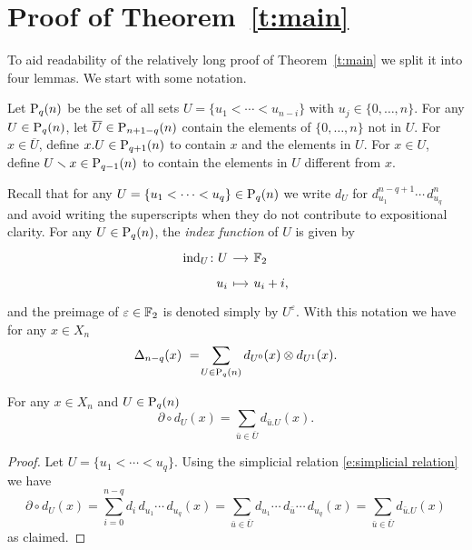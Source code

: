 
\section{Proof of Theorem~\ref{t:main}} \label{s:proof}

To aid readability of the relatively long proof of Theorem~\ref{t:main} we split it into four lemmas.
We start with some notation.

\begin{definition}
	Let $\P_q(n)$ be the set of all sets $U = \{u_1 < \cdots < u_{n-i}\}$ with $u_j \in \{0, \dots, n\}$.
	For any $U \in \P_q(n)$, let $\overline{U} \in \P_{n+1-q}(n)$ contain the elements of $\{0, \dots, n\}$ not in $U$. For $x \in \overline{U}$, define $x.U \in \P_{q+1}(n)$ to contain $x$ and the elements in $U$.
	For $x \in U$, define $U \sm x \in \P_{q-1}(n)$ to contain the elements in $U$ different from $x$.
\end{definition}

Recall that for any $U = \{u_1 < \cdots < u_q\} \in \P_q(n)$ we write $d_U$ for $d_{u_1}^{n-q+1} \cdots \,d_{u_q}^n$ and avoid writing the superscripts when they do not contribute to expositional clarity.
For any $U \in \P_q(n)$, the \textit{index function} of $U$ is given by
\begin{equation*}
\begin{tikzcd}[row sep=tiny, column sep=small,
/tikz/column 1/.append style={anchor=base east},
/tikz/column 2/.append style={anchor=base west}]
\ind_U \colon U \arrow[r] & \F_2 \\
u_i \arrow[r, mapsto] & u_i + i,
\end{tikzcd}
\end{equation*}
and the preimage of $\varepsilon \in \F_2$ is denoted simply by $U^\varepsilon$.
With this notation we have for any $x \in X_n$
\begin{equation*}
\Delta_{n-q}(x)\ =\! \sum_{U \in \P_q(n)} d_{U^0}(x) \otimes d_{U^1}(x).
\end{equation*}

\begin{lemma} \label{l:partial dU = dxU}
	For any $x \in X_n$ and $U \in \P_{q}(n)$
	\begin{equation} \label{lemma1: existence:eq1}
	\partial \circ d_U(x) = \sum_{\bar{u} \in \overline{U}} d_{\bar{u}.U}(x).
	\end{equation}
\end{lemma}

\begin{proof}
	Let $U = \{u_1 < \cdots < u_q\}$. Using the simplicial relation \eqref{e:simplicial relation} we have
	\begin{equation*}
	\partial \circ d_U(x) = 
	\sum_{i=0}^{n-q} d_i\, d_{u_1} \cdots\, d_{u_q}(x) = 
	\sum_{\bar{u} \in \overline{U}} d_{u_1} \cdots\, d_{\bar{u}} \cdots\, d_{u_q}(x) =
	\sum_{\bar{u} \in \overline{U}} d_{\bar{u}.U}(x)
	\end{equation*}
	as claimed.
\end{proof}

